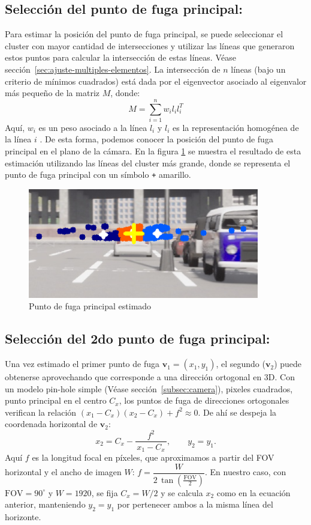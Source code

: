 \subsection{Selección del punto de fuga principal:}

Para estimar la posición del punto de fuga principal, se puede seleccionar el cluster con mayor cantidad de intersecciones y
utilizar las líneas que generaron estos puntos para calcular la intersección de estas líneas. Véase sección~\ref{sec:ajuste-multiples-elementos}.
La intersección de $n$ líneas (bajo un criterio de mínimos cuadrados) está dada por
el eigenvector asociado al eigenvalor más pequeño de la matriz $M$, donde:
\[
    M = \sum_{i=1}^{n} w_i l_i l_i^T
\]
Aquí, $w_i$ es un peso asociado a la línea $l_i$ y $l_i$ es la representación homogénea de la línea $i$ \cite{kanatani1998statistical}.
De esta forma, podemos conocer la posición del punto de fuga principal en el plano de la cámara.
En la figura \ref{fig:vanishingPoint} se muestra el resultado de esta estimación utilizando las líneas del cluster más grande, donde se
representa el punto de fuga principal con un símbolo \texttt{+} amarillo.
\begin{figure}[!ht]
    \centering
    \includegraphics[width=0.9\textwidth]{img/reticule/vanishingPoint}
    \caption{Punto de fuga principal estimado}
    \label{fig:vanishingPoint}
\end{figure}

\subsection{Selección del 2do punto de fuga principal:}

Una vez estimado el primer punto de fuga \(\mathbf{v}_1=(x_1,y_1)\), el segundo (\(\mathbf{v}_2\)) puede obtenerse
aprovechando que corresponde a una dirección ortogonal en 3D. Con un modelo pin-hole simple (Véase sección~\ref{subsec:camera}), pixeles cuadrados, punto principal
en el centro \(C_x\), los puntos de fuga de direcciones ortogonales verifican la relación
\( (x_1-C_x)(x_2-C_x) + f^2 \approx 0 \). De ahí se despeja la coordenada horizontal de \(\mathbf{v}_2\):
\begin{equation}
    x_2 = C_x - \frac{f^2}{\,x_1 - C_x\,}, \qquad y_2 = y_1.
\end{equation}
Aquí \(f\) es la longitud focal en píxeles, que aproximamos a partir del FOV horizontal y el ancho de imagen \(W\):
\( f = \dfrac{W}{2\,\tan(\tfrac{\text{FOV}}{2})} \). En nuestro caso, con \(\text{FOV}=90^\circ\) y \(W=1920\), se fija
\(C_x=W/2\) y se calcula \(x_2\) como en la ecuación anterior, manteniendo \(y_2=y_1\) por pertenecer ambos a la misma línea del horizonte.

